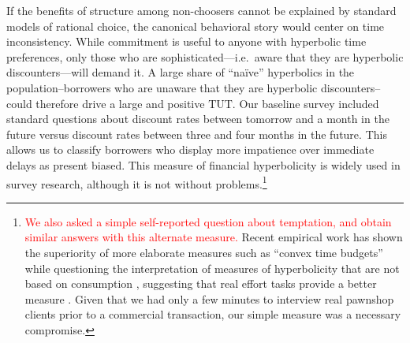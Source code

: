 \documentclass[12pt, a4paper, colorinlistoftodos]{article}
\begin{document}
If the benefits of structure among non-choosers cannot be explained by standard models of rational choice, the canonical behavioral story would center on time inconsistency.  While commitment is useful to anyone with hyperbolic time preferences, only those who are sophisticated---i.e.\ aware that they are hyperbolic discounters---will demand it.  A large share of ``na\"ive'' hyperbolics in the population--borrowers who are unaware that they are hyperbolic discounters--could therefore drive a large and positive $\text{TUT}$.  Our baseline survey included standard questions about discount rates between tomorrow and a month in the future versus discount rates between three and four months in the future.
This allows us to classify borrowers who display more impatience over immediate delays as present biased. This measure of financial hyperbolicity is widely used in survey research, although it is not without problems.\footnote{\textcolor{red}{We also asked a simple self-reported question about temptation, and obtain similar answers with this alternate measure.} Recent empirical work has shown the superiority of more elaborate measures such as ``convex time budgets'' \citep{andreoni2015measuring} while questioning the interpretation of measures of hyperbolicity that are not based on consumption \citep{andreoni2012estimating, cohen2020measuring}, suggesting that real effort tasks provide a better measure \citep{augenblick2015working}.  Given that we had only a few minutes to interview real pawnshop clients prior to a commercial transaction, our simple measure was a necessary compromise.}   
\end{document}
